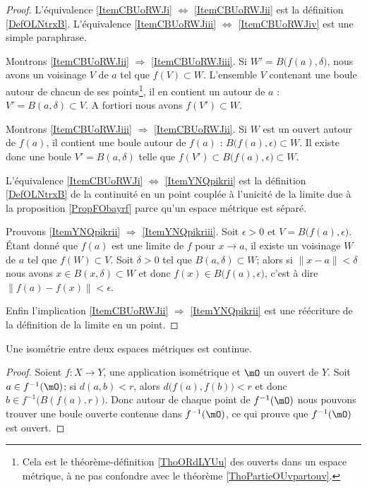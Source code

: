 \begin{proof}
    L'équivalence \ref{ItemCBUoRWJi} \( \Leftrightarrow\) \ref{ItemCBUoRWJii} est la définition \ref{DefOLNtrxB}. L'équivalence \ref{ItemCBUoRWJiii} \( \Leftrightarrow\) \ref{ItemCBUoRWJiv} est une simple paraphrase.

    Montrons \ref{ItemCBUoRWJii} \( \Rightarrow\) \ref{ItemCBUoRWJiii}. Si \( W'=B\big( f(a),\delta \big)\), nous avons un voisinage \( V\) de \( a\) tel que \( f(V)\subset W\). L'ensemble \( V\) contenant une boule autour de chacun de ses points\footnote{Cela est le théorème-définition \ref{ThoORdLYUu} des ouverts dans un espace métrique, à ne pas confondre avec le théorème \ref{ThoPartieOUvpartouv}.}, il en contient un autour de \( a\) : \( V'=B(a,\delta)\subset V\). A fortiori nous avons \( f(V')\subset W\).

    Montrons \ref{ItemCBUoRWJiii} \( \Rightarrow\) \ref{ItemCBUoRWJii}. Si \( W\) est un ouvert autour de \( f(a)\), il contient une boule autour de \( f(a)\) : \( B\big( f(a),\epsilon \big)\subset W\). Il existe donc une boule \( V'=B(a,\delta)\) telle que \( f(V')\subset B\big( f(a),\epsilon \big)\subset W\).

    L'équivalence \ref{ItemCBUoRWJi} \( \Leftrightarrow\) \ref{ItemYNQpikrii} est la définition \ref{DefOLNtrxB} de la continuité en un point couplée à l'unicité de la limite due à la proposition \ref{PropFObayrf} parce qu'un espace métrique est séparé.

    Prouvons \ref{ItemYNQpikrii} \( \Rightarrow\) \ref{ItemYNQpikriii}. Soit \( \epsilon>0\) et \( V=B\big( f(a),\epsilon \big)\). Étant donné que \( f(a)\) est une limite de \( f\) pour \( x\to a\), il existe un voisinage \( W\) de \( a\) tel que \( f(W)\subset V\). Soit \( \delta>0\) tel que \( B(a,\delta)\subset W\); alors si \( \| x-a \|<\delta\) nous avons \( x\in B(x,\delta)\subset W\) et donc \( f(x)\in B\big( f(a),\epsilon \big)\), c'est à dire \( \| f(a)-f(x) \|<\epsilon\).

    Enfin l'implication \ref{ItemCBUoRWJii} \( \Rightarrow\) \ref{ItemYNQpikrii} est une réécriture de la définition de la limite en un point.
\end{proof}

\begin{proposition}\label{PropLYMgVMJ}
    Une isométrie entre deux espaces métriques est continue.
\end{proposition}

\begin{proof}
    Soient \( f\colon X\to Y\), une application isométrique et \( \mO\) un ouvert de \( Y\). Soit \( a\in f^{-1}(\mO)\); si \( d(a,b)<r\), alors \( d\big( f(a),f(b) \big)<r\) et donc \( b\in f^{-1}\big( B(f(a),r) \big)\). Donc autour de chaque point de \( f^{-1}(\mO)\) nous pouvons trouver une boule ouverte contenue dans \( f^{-1}(\mO)\), ce qui prouve que \( f^{-1}(\mO)\) est ouvert.
\end{proof}


